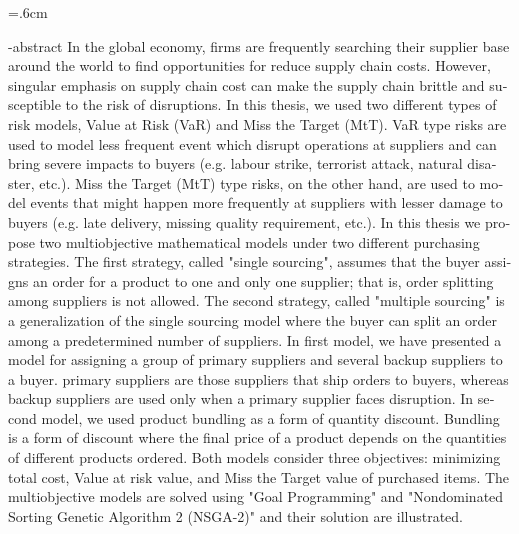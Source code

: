 
\baselineskip=.6cm
\begin{latin}
\en-abstract{
In the global economy, firms are frequently searching their supplier base around the world to find opportunities for reduce supply chain costs. However, singular emphasis on supply chain cost can make the supply chain brittle and susceptible to the risk of disruptions. In this thesis, we used two different types of risk models, Value at Risk (VaR) and Miss the Target (MtT). VaR type risks are used to model less frequent event which disrupt operations at suppliers and can bring severe impacts to buyers (e.g. labour strike, terrorist attack, natural disaster, etc.). Miss the Target (MtT) type risks, on the other hand, are used to model events that might happen more frequently at suppliers with lesser damage to buyers (e.g. late delivery, missing quality requirement, etc.). In this thesis we propose two multiobjective mathematical models under two different purchasing strategies. The first strategy, called "single sourcing", assumes that the buyer assigns an order for a product to one and only one supplier; that is, order splitting among suppliers is not allowed. The second strategy, called "multiple sourcing" is a generalization of the single sourcing model where the buyer can split  an order among a predetermined number of suppliers. In first model, we have presented a model for assigning a group of primary suppliers and several backup suppliers to a buyer. primary suppliers are those suppliers that ship orders to buyers, whereas backup suppliers are used only when a primary supplier faces disruption. In second model, we used product bundling as a form of quantity discount. Bundling is a form of discount where the final price of a product depends on the quantities of different products ordered. Both models consider three objectives: minimizing total cost, Value at risk value, and Miss the Target value of purchased items. The multiobjective models are solved using "Goal Programming" and "Nondominated Sorting Genetic Algorithm 2 (NSGA-2)" and their solution are illustrated.
}

\latinfirstPage

\end{latin}
\clearpage~
\thispagestyle{empty}

